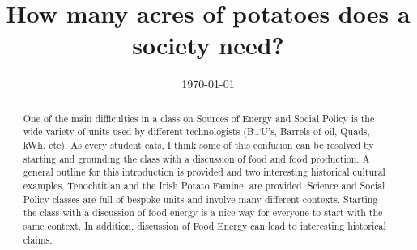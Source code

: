 \documentclass[prb,preprint]{revtex4-2}
\begin{document}
\title{How many acres of potatoes does a society need?} 


\date{\today}

\begin{abstract}
One of the main difficulties in a class on Sources of Energy and Social Policy is the wide variety of units used by different technologists (BTU's, Barrels of oil, Quads, kWh, etc).  As every student eats, I think some of this confusion can be resolved by starting and grounding the class with a discussion of food and food production.  A general outline for this introduction is provided and two interesting historical cultural examples, Tenochtitlan and the Irish Potato Famine, are provided.  
Science and Social Policy classes are full of bespoke units and involve many different contexts.  Starting the class with a discussion of food energy is a nice way for everyone to start with the same context.  In addition, discussion of Food Energy can lead to interesting historical claims. 
\end{abstract}
\maketitle
\end{document}

